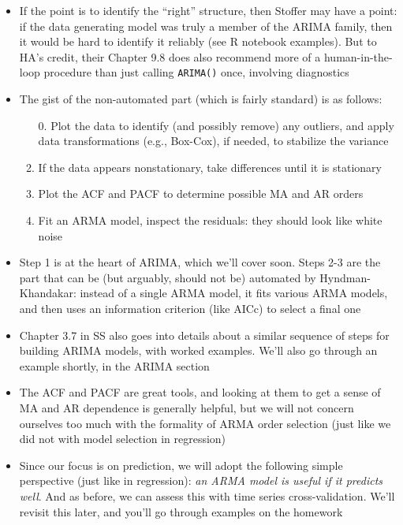 \documentclass{article}
\begin{document}
\begin{itemize}
\item If the point is to identify the ``right'' structure, then Stoffer may have
  a point: if the data generating model was truly a member of the ARIMA family,
  then it would be hard to identify it reliably (see R notebook examples). But
  to HA's credit, their Chapter 9.8 does also recommend more of a
  human-in-the-loop procedure than just calling \verb|ARIMA()| once, involving 
  diagnostics 

\item The gist of the non-automated part (which is fairly standard) is as
  follows: 
  \begin{enumerate}
  \item[0.] Plot the data to identify (and possibly remove) any outliers, and 
   apply data transformations (e.g., Box-Cox), if needed, to stabilize the  
   variance   
  \item If the data appears nonstationary, take differences until it is
    stationary 
  \item Plot the ACF and PACF to determine possible MA and AR orders 
  \item Fit an ARMA model, inspect the residuals: they should look like white 
    noise 
  \end{enumerate}

\item Step 1 is at the heart of ARIMA, which we'll cover soon. Steps 2-3 are the
  part that can be (but arguably, should not be) automated by Hyndman-Khandakar:  
  instead of a single ARMA model, it fits various ARMA models, and then uses an
  information criterion (like AICc) to select a final one  

\item Chapter 3.7 in SS also goes into details about a similar sequence of steps
  for building ARIMA models, with worked examples. We'll also go through an
  example shortly, in the ARIMA section 

\item The ACF and PACF are great tools, and looking at them to get a sense of MA
  and AR dependence is generally helpful, but we will not concern ourselves too
  much with the formality of ARMA order selection (just like we did not with
  model selection in regression) 

\item Since our focus is on prediction, we will adopt the following simple
  perspective (just like in regression): \emph{an ARMA model is useful if it
    predicts well}. And as before, we can assess this with time series
  cross-validation. We'll revisit this later, and you'll go through examples on
  the homework 
\end{itemize}
\end{document}
